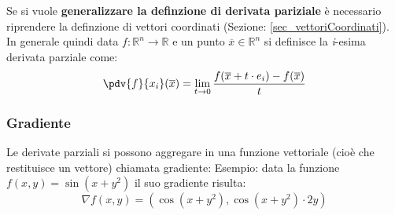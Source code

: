 Se si vuole \textbf{generalizzare la definzione di derivata pariziale} è 
necessario riprendere la definzione di vettori coordinati (Sezione: 
\ref{sec_vettoriCoordinati}). In generale quindi data $f: \mathbb{R}^n \to 
\mathbb{R}$ e un punto $\overline{x} \in \mathbb{R}^n$ si definisce la 
\textit{i}-esima derivata parziale come:
\begin{equation*}
	\pdv{f}{x_i}(\overline{x}) = \lim_{t \to 0} \dfrac{f(\overline{x} + t 
	\cdot e_i) - f(\overline{x})}{t}
\end{equation*}

\subsubsection{Gradiente}
Le derivate parziali si possono aggregare in una funzione vettoriale (cioè che 
restituisce un vettore) chiamata gradiente:
Esempio: data la funzione $f(x, y) = \sin(x + y^2)$ il suo gradiente risulta:
\begin{equation*}
	\nabla f (x, y) = (\cos(x + y^2), \cos(x + y^2) \cdot 2y)
\end{equation*}

